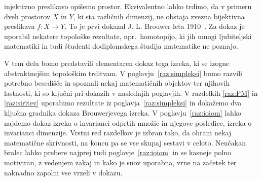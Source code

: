 \documentclass[mat1]{fmfdelo}
\newcommand{\0}{\underline{0}}
\begin{document}
injektivno preslikavo opišemo prostor. Ekvivalentno lahko trdimo, da v primeru dveh prostorov $X$ in $Y$, ki sta različnih dimenzij, ne obstaja zvezna bijektivna preslikava $f : X \to Y$. To je prvi dokazal J. L. Brouwer leta 1910~\cite[str.\ 208]{Gouvea2011}. Za dokaz je uporabil nekatere topološke rezultate, npr.\ homotopijo, ki jih mnogi ljubiteljski matematiki in tudi študenti dodiplomskega študija matematike ne poznajo. 

V tem delu bomo predstavili elementaren dokaz tega izreka, ki se izogne abstraktnejšim topološkim trditvam. V poglavju~\ref{raz:simpleksi} bomo razvili potrebno besedišče in spoznali nekaj matematičnih objektov ter njihovih lastnosti, ki so ključni pri dokazih v naslednjih poglavjih. V razdelkih \ref{raz:PM} in \ref{raz:siritev} uporabimo rezultate iz poglavja~\ref{raz:simpleksi} in dokažemo dva ključna gradnika dokaza Brouwerjevega izreka. V poglavju~\ref{raz:ioiom} lahko najdemo dokaz izreka o invarianci odprtih množic in njegove posledice, izreka o invarianci dimenzije. Vrstni red razdelkov je izbran tako, da ohrani nekaj matematične skrivnosti, na koncu pa se vse skupaj sestavi v celoto. Neučakan bralec lahko prebere najprej tudi poglavje~\ref{raz:ioiom} in se kasneje polno motiviran, z vedenjem zakaj in kako je snov uporabna, vrne na začetek ter naknadno zapolni vse vrzeli v dokazu.


\end{document}
